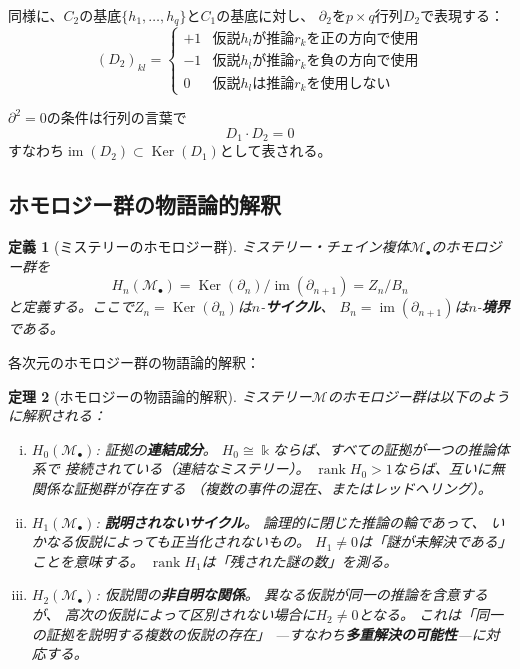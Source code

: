 \documentclass[12pt,twocolumn]{ltjsarticle}
\newtheorem{theorem}{定理}[section]
\newtheorem{definition}[theorem]{定義}
\newcommand{\im}{\operatorname{im}}
\newcommand{\Ker}{\operatorname{Ker}}
\renewcommand{\rank}{\operatorname{rank}}
\newcommand{\Mys}{\mathcal{M}}
\newcommand{\kk}{\Bbbk}
\begin{document}
同様に、$C_2$の基底$\{h_1, \ldots, h_q\}$と$C_1$の基底に対し、
$\partial_2$を$p \times q$行列$D_2$で表現する：
\begin{equation}
(D_2)_{kl} = \begin{cases}
+1 & \text{仮説$h_l$が推論$r_k$を正の方向で使用} \\
-1 & \text{仮説$h_l$が推論$r_k$を負の方向で使用} \\
0 & \text{仮説$h_l$は推論$r_k$を使用しない}
\end{cases}
\label{eq:D2}
\end{equation}

$\partial^2 = 0$の条件は行列の言葉で
\begin{equation}
D_1 \cdot D_2 = 0
\label{eq:d2_matrix}
\end{equation}
すなわち$\im(D_2) \subset \Ker(D_1)$として表される。

\subsection{ホモロジー群の物語論的解釈}

\begin{definition}[ミステリーのホモロジー群]
\label{def:homology}
ミステリー・チェイン複体$\Mys_\bullet$のホモロジー群を
\begin{equation}
H_n(\Mys_\bullet) = \Ker(\partial_n) / \im(\partial_{n+1})
= Z_n / B_n
\end{equation}
と定義する。ここで$Z_n = \Ker(\partial_n)$は$n$-\textbf{サイクル}、
$B_n = \im(\partial_{n+1})$は$n$-\textbf{境界}である。
\end{definition}

各次元のホモロジー群の物語論的解釈：

\begin{theorem}[ホモロジーの物語論的解釈]
\label{thm:interpretation}
ミステリー$\Mys$のホモロジー群は以下のように解釈される：
\begin{enumerate}[(i)]
\item $H_0(\Mys_\bullet)$: 証拠の\textbf{連結成分}。
$H_0 \cong \kk$ならば、すべての証拠が一つの推論体系で
接続されている（連結なミステリー）。
$\rank H_0 > 1$ならば、互いに無関係な証拠群が存在する
（複数の事件の混在、またはレッドヘリング）。

\item $H_1(\Mys_\bullet)$: \textbf{説明されないサイクル}。
論理的に閉じた推論の輪であって、
いかなる仮説によっても正当化されないもの。
$H_1 \neq 0$は「謎が未解決である」ことを意味する。
$\rank H_1$は「残された謎の数」を測る。

\item $H_2(\Mys_\bullet)$: 仮説間の\textbf{非自明な関係}。
異なる仮説が同一の推論を含意するが、
高次の仮説によって区別されない場合に$H_2 \neq 0$となる。
これは「同一の証拠を説明する複数の仮説の存在」
---すなわち\textbf{多重解決の可能性}---に対応する。
\end{enumerate}
\end{theorem}
\end{document}
